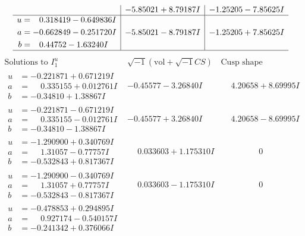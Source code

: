 \documentclass[1p]{elsarticle_modified}
\theoremstyle{definition}
\newcommand{\I}{\sqrt{-1}}
\begin{document}
$$\begin{array}{c|c|c}
 & -5.85021 + 8.79187 I & -1.25205 - 7.85625 I \\ \hline\begin{aligned}
u &= \phantom{-}0.318419 - 0.649836 I \\
a &= -0.662849 - 0.251720 I \\
b &= \phantom{-}0.44752 - 1.63240 I\end{aligned}
 & -5.85021 - 8.79187 I & -1.25205 + 7.85625 I\\
 \hline 
 \end{array}$$\newpage$$\begin{array}{c|c|c}  
\text{Solutions to }I^u_{1}& \I (\text{vol} + \sqrt{-1}CS) & \text{Cusp shape}\\
 \hline 
\begin{aligned}
u &= -0.221871 + 0.671219 I \\
a &= \phantom{-}0.335155 + 0.012761 I \\
b &= -0.34810 + 1.38867 I\end{aligned}
 & -0.45577 - 3.26840 I & \phantom{-}4.20658 + 8.69995 I \\ \hline\begin{aligned}
u &= -0.221871 - 0.671219 I \\
a &= \phantom{-}0.335155 - 0.012761 I \\
b &= -0.34810 - 1.38867 I\end{aligned}
 & -0.45577 + 3.26840 I & \phantom{-}4.20658 - 8.69995 I \\ \hline\begin{aligned}
u &= -1.290900 + 0.340769 I \\
a &= \phantom{-}1.31057 - 0.77757 I \\
b &= -0.532843 + 0.817367 I\end{aligned}
 & \phantom{-}0.033603 + 1.175310 I & \phantom{-0.000000 } 0 \\ \hline\begin{aligned}
u &= -1.290900 - 0.340769 I \\
a &= \phantom{-}1.31057 + 0.77757 I \\
b &= -0.532843 - 0.817367 I\end{aligned}
 & \phantom{-}0.033603 - 1.175310 I & \phantom{-0.000000 } 0 \\ \hline\begin{aligned}
u &= -0.478853 + 0.294895 I \\
a &= \phantom{-}0.927174 - 0.540157 I \\
b &= -0.241342 + 0.376066 I\end{aligned}

\end{array}$$
\end{document}
